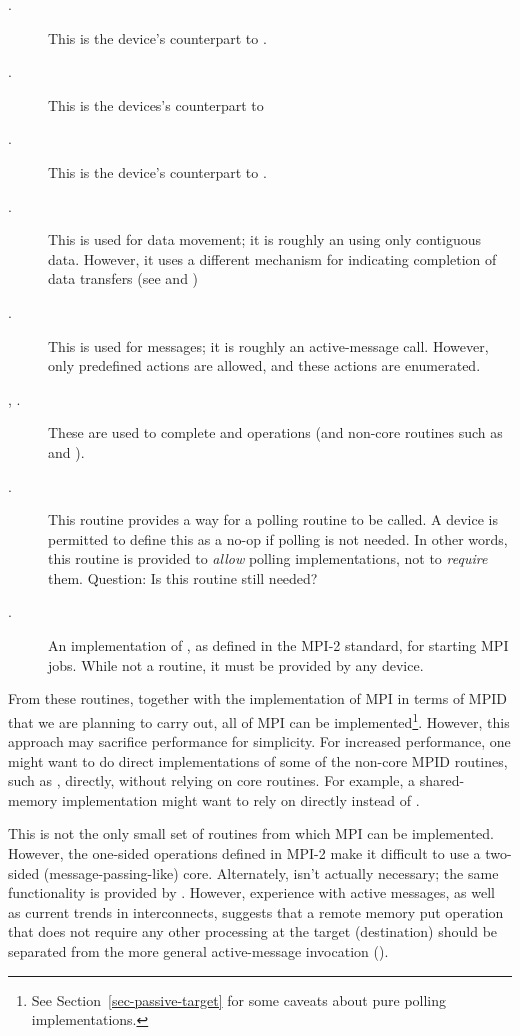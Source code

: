 \documentclass{article}
\begin{document}
\begin{description}
\item[.] This is the device's counterpart to
. 
\item[.] This is the devices's counterpart to
\item[.] This is the device's counterpart to .
\item[.] This is used for data movement; it is roughly an
 using only contiguous data.  However, it uses a
different mechanism for indicating completion of data transfers (see  and )
\item[.] This is used for messages; it is roughly an
active-message call.  However, only predefined actions are allowed,
and these actions are enumerated.
\item[, .] These
are used to complete  
and  operations (and non-core routines such as
 and ). 
\item[.] This routine provides a way for a polling routine to
be called.  A device is permitted to define this as a no-op if polling
is not needed.  In other words, this routine is provided to
\emph{allow} polling implementations, not to \emph{require} them.
Question: Is this routine still needed?
\item[.] An implementation of , as defined in the
  MPI-2 standard, for starting MPI jobs.  While not a routine, it must be 
  provided by any device.  
\end{description}
From these routines, together with the implementation of MPI in terms of MPID
that we are planning to carry out, all of MPI can be implemented\footnote{See
Section~\ref{sec-passive-target} for some caveats about pure polling
implementations.}.  However, this approach may sacrifice performance
for simplicity.  For increased performance, one might want to do direct
implementations of some of the non-core MPID routines, such as
, directly, without relying on core routines.  For example, a
shared-memory implementation might want to rely on  directly
instead of .

This is not the only small set of routines from which MPI can be
implemented.  However, the one-sided operations defined in MPI-2 make
it difficult to use a two-sided (message-passing-like) core.
Alternately,  isn't actually necessary; the same
functionality is provided by .  However, experience
with active messages, as well as current trends in interconnects,
suggests that a remote memory put operation that does not require any
other processing at the target (destination) should be separated from
the more general active-message invocation ().
\end{document}
